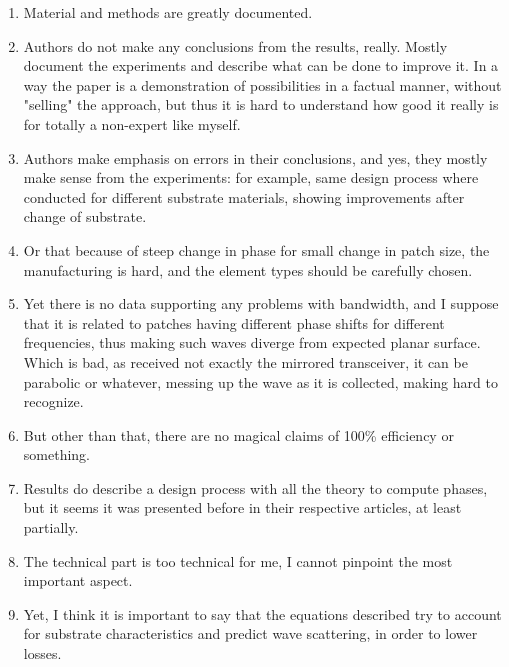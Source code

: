 \documentclass{article}
\begin{document}
\begin{enumerate}
        \item Material and methods are greatly documented.
        \item Authors do not make any conclusions from the results, really. Mostly document the experiments and describe what can be done to improve it. In a way the paper is a demonstration of possibilities in a factual manner, without "selling" the approach, but thus it is hard to understand how good it really is for totally a non-expert like myself.
        \item Authors make emphasis on errors in their conclusions, and yes, they mostly make sense from the experiments: for example, same design process where conducted for different substrate materials, showing improvements after change of substrate.
        \item Or that because of steep change in phase for small change in patch size, the manufacturing is hard, and the element types should be carefully chosen.
        \item Yet there is no data supporting any problems with bandwidth, and I suppose that it is related to patches having different phase shifts for different frequencies, thus making such waves diverge from expected planar surface. Which is bad, as received not exactly the mirrored transceiver, it can be parabolic or whatever, messing up the wave as it is collected, making hard to recognize.
        \item But other than that, there are no magical claims of 100\% efficiency or something.
        \item Results do describe a design process with all the theory to compute phases, but it seems it was presented before in their respective articles, at least partially.
        \item The technical part is too technical for me, I cannot pinpoint the most important aspect.
        \item Yet, I think it is important to say that the equations described try to account for substrate characteristics and predict wave scattering, in order to lower losses.
    \end{enumerate}
\end{document}
